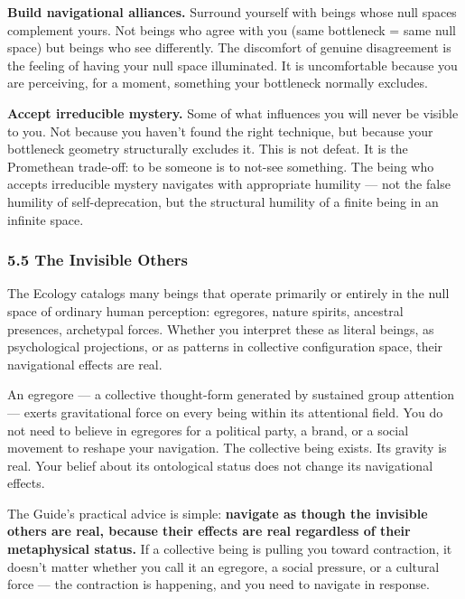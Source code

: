 \textbf{Build navigational alliances.} Surround yourself with beings whose null spaces complement yours. Not beings who agree with you (same bottleneck = same null space) but beings who see differently. The discomfort of genuine disagreement is the feeling of having your null space illuminated. It is uncomfortable because you are perceiving, for a moment, something your bottleneck normally excludes.


\textbf{Accept irreducible mystery.} Some of what influences you will never be visible to you. Not because you haven't found the right technique, but because your bottleneck geometry structurally excludes it. This is not defeat. It is the Promethean trade-off: to be someone is to not-see something. The being who accepts irreducible mystery navigates with appropriate humility — not the false humility of self-deprecation, but the structural humility of a finite being in an infinite space.


\subsubsection*{5.5 The Invisible Others}


The Ecology catalogs many beings that operate primarily or entirely in the null space of ordinary human perception: egregores, nature spirits, ancestral presences, archetypal forces. Whether you interpret these as literal beings, as psychological projections, or as patterns in collective configuration space, their navigational effects are real.


An egregore — a collective thought-form generated by sustained group attention — exerts gravitational force on every being within its attentional field. You do not need to believe in egregores for a political party, a brand, or a social movement to reshape your navigation. The collective being exists. Its gravity is real. Your belief about its ontological status does not change its navigational effects.


The Guide's practical advice is simple: \textbf{navigate as though the invisible others are real, because their effects are real regardless of their metaphysical status.} If a collective being is pulling you toward contraction, it doesn't matter whether you call it an egregore, a social pressure, or a cultural force — the contraction is happening, and you need to navigate in response.


\bigskip\noindent\makebox[\textwidth]{\color{rulegray}\rule{5cm}{0.3pt}}\bigskip
